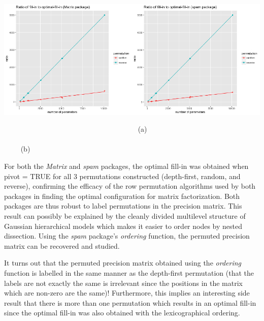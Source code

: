 \documentclass[]{article}
\begin{document}
\begin{center}\includegraphics[width=400bp]{Paper_files/figure-latex/plots-1} \end{center}

~~~~~~~~~~~~~~~~~~~~~~~~~~~~~~~~~~~~~ (a)
~~~~~~~~~~~~~~~~~~~~~~~~~~~~~~~~~~~~~~~~~~~~~~~~~~~~~~~~~~~~~~~~~~~~~~~~~~~~
(b)

\begin{center}   \end{center}

\vspace{0.6cm}

\newline 

For both the \emph{Matrix} and \emph{spam} packages, the optimal fill-in
was obtained when pivot = TRUE for all 3 permutations constructed
(depth-first, random, and reverse), confirming the efficacy of the row
permutation algorithms used by both packages in finding the optimal
configuration for matrix factorization. Both packages are thus robust to
label permutations in the precision matrix. This result can possibly be
explained by the cleanly divided multilevel structure of Gaussian
hierarchical models which makes it easier to order nodes by nested
dissection. Using the \emph{spam} package's \emph{ordering} function,
the permuted precision matrix can be recovered and studied.

It turns out that the permuted precision matrix obtained using the
\emph{ordering} function is labelled in the same manner as the
depth-first permutation (that the labels are not exactly the same is
irrelevant since the positions in the matrix which are non-zero are the
same)! Furthermore, this implies an interesting side result that there
is more than one permutation which results in an optimal fill-in since
the optimal fill-in was also obtained with the lexicographical ordering.
\end{document}
